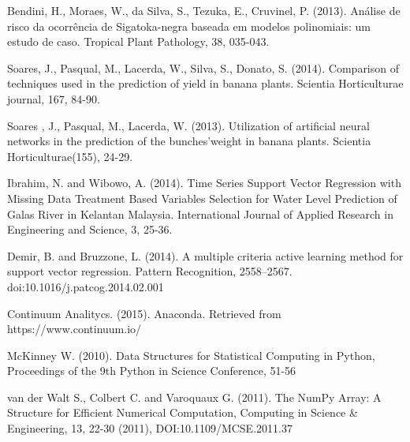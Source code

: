 \documentclass[review]{elsarticle}
\begin{document}
\begin{thebibliography}{1}
 Bendini, H., Moraes, W., da Silva, S., Tezuka, E., Cruvinel, P. (2013). Análise de risco da ocorrência de Sigatoka-negra baseada em modelos polinomiais: um estudo de caso. Tropical Plant Pathology, 38, 035-043.

 Soares, J., Pasqual, M., Lacerda, W., Silva, S., Donato, S. (2014). Comparison of techniques used in the prediction of yield in banana plants. Scientia Horticulturae journal, 167, 84-90.

 Soares , J., Pasqual, M., Lacerda, W. (2013). Utilization of artificial neural networks in the prediction of the bunches’weight in banana plants. Scientia Horticulturae(155), 24-29.

  Ibrahim, N. and Wibowo, A. (2014). Time Series Support Vector Regression with Missing Data Treatment Based Variables Selection for Water Level Prediction of Galas River in Kelantan Malaysia. International Journal of Applied Research in Engineering and Science, 3, 25-36.

 Demir, B. and Bruzzone, L. (2014). A multiple criteria active learning method for support vector regression. Pattern Recognition, 2558–2567. doi:10.1016/j.patcog.2014.02.001

 Continuum Analitycs. (2015). Anaconda. Retrieved from https://www.continuum.io/

 McKinney W. (2010). Data Structures for Statistical Computing in Python, Proceedings of the 9th Python in Science Conference, 51-56 

 van der Walt S., Colbert C. and Varoquaux G. (2011). The NumPy Array: A Structure for Efficient Numerical Computation, Computing in Science \& Engineering, 13, 22-30 (2011), DOI:10.1109/MCSE.2011.37 




\end{thebibliography}
\end{document}
